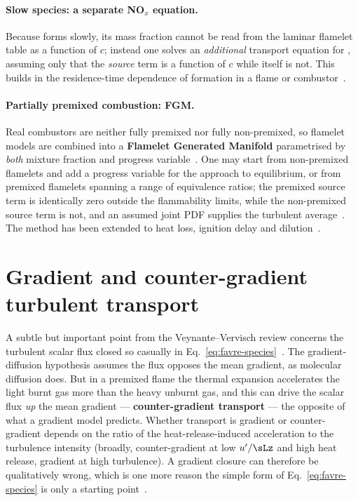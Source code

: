 \paragraph{Slow species: a separate \texorpdfstring{NO$_x$}{NOx} equation.} Because  forms slowly, its mass fraction cannot be read from the laminar flamelet table as a function of $c$; instead one solves an \emph{additional} transport equation for , assuming only that the  \emph{source} term is a function of $c$ while  itself is not. This builds in the residence-time dependence of  formation in a flame or combustor~\cite{lecture10}.

\paragraph{Partially premixed combustion: FGM.} Real combustors are neither fully premixed nor fully non-premixed, so flamelet models are combined into a \textbf{Flamelet Generated Manifold} parametrised by \emph{both} mixture fraction and progress variable~\cite{lecture10}. One may start from non-premixed flamelets and add a progress variable for the approach to equilibrium, or from premixed flamelets spanning a range of equivalence ratios; the premixed source term is identically zero outside the flammability limits, while the non-premixed source term is not, and an assumed joint PDF supplies the turbulent average~\cite{lecture10}. The method has been extended to heat loss, ignition delay and dilution~\cite{lecture10}.

\section{Gradient and counter-gradient turbulent transport}

A subtle but important point from the Veynante--Vervisch review concerns the turbulent scalar flux closed so casually in Eq.~\eqref{eq:favre-species}~\cite{veynante2002turbulent}. The gradient-diffusion hypothesis assumes the flux opposes the mean gradient, as molecular diffusion does. But in a premixed flame the thermal expansion accelerates the light burnt gas more than the heavy unburnt gas, and this can drive the scalar flux \emph{up} the mean gradient --- \textbf{counter-gradient transport} --- the opposite of what a gradient model predicts. Whether transport is gradient or counter-gradient depends on the ratio of the heat-release-induced acceleration to the turbulence intensity (broadly, counter-gradient at low $u'/\sLz$ and high heat release, gradient at high turbulence). A gradient closure can therefore be qualitatively wrong, which is one more reason the simple form of Eq.~\eqref{eq:favre-species} is only a starting point~\cite{veynante2002turbulent}.

